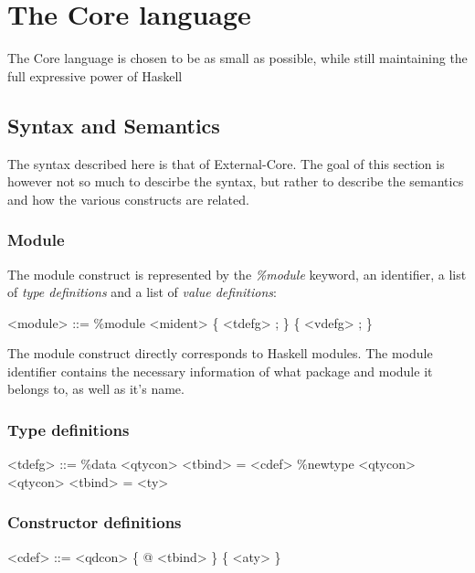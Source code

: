 
\chapter{The Core language}

The Core language is chosen to be as small as possible, while still maintaining 
the full expressive power of Haskell

\section*{Syntax and Semantics}

The syntax described here is that of External-Core. The goal of this section is
however not so much to descirbe the syntax, but rather to describe the semantics and 
how the various constructs are related.

\subsection*{Module}

The module construct is represented by the \emph{\%module} keyword, an identifier,
a list of \emph{type definitions} and a list of \emph{value definitions}:

\begin{grammar}
<module> ::= \%module <mident> \{ <tdefg> ; \} \{ <vdefg> ; \}
\end{grammar}

The module construct directly corresponds to Haskell modules. The module identifier
contains the necessary information of what package and module it belongs to, as
well as it's name.

\subsection*{Type definitions}

\begin{grammar}
<tdefg> ::= \%data <qtycon> <tbind> = <cdef>
       \alt \%newtype <qtycon> <qtycon> <tbind> = <ty>
\end{grammar}


\subsection*{Constructor definitions}

\begin{grammar}
<cdef> ::= <qdcon> \{ @ <tbind> \} \{ <aty> \}
\end{grammar}

